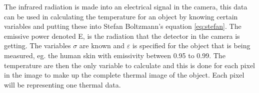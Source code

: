 The infrared radiation is made into an electrical signal in the camera, this data can be used in calculating the temperature for an object by knowing certain variables and putting these into Stefan Boltzmann's equation \ref{eq:stefan}. The emissive power denoted E, is the radiation that the detector in the camera is getting. The variables $\sigma$ are known and $\varepsilon$ is specified for the object that is being measured, eg. the human skin with emissivity between 0.95 to 0.99. The temperature are then the only variable to calculate and this is done for each pixel in the image to make up the complete thermal image of the object. Each pixel will be representing one thermal data. \cite{ignacio2017}



%
%
%
%
%
%
%
%




